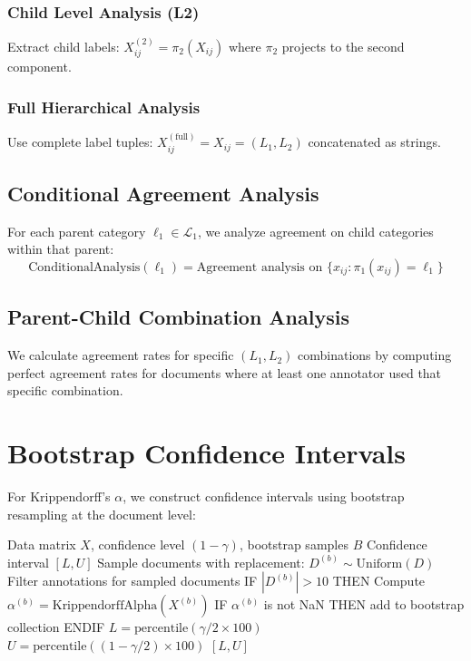 \documentclass[11pt]{article}
\begin{document}
\subsubsection{Child Level Analysis (L2)}
Extract child labels: $X^{(2)}_{ij} = \pi_2(X_{ij})$ where $\pi_2$ projects to the second component.

\subsubsection{Full Hierarchical Analysis}
Use complete label tuples: $X^{(\text{full})}_{ij} = X_{ij} = (L_1, L_2)$ concatenated as strings.

\subsection{Conditional Agreement Analysis}

For each parent category $\ell_1 \in \mathcal{L}_1$, we analyze agreement on child categories within that parent:
\begin{equation}
\text{ConditionalAnalysis}(\ell_1) = \text{Agreement analysis on } \{x_{ij} : \pi_1(x_{ij}) = \ell_1\}
\end{equation}

\subsection{Parent-Child Combination Analysis}

We calculate agreement rates for specific $(L_1, L_2)$ combinations by computing perfect agreement rates for documents where at least one annotator used that specific combination.

\section{Bootstrap Confidence Intervals}

For Krippendorff's $\alpha$, we construct confidence intervals using bootstrap resampling at the document level:

\begin{algorithm}
\caption{Bootstrap Confidence Interval (as implemented)}
\begin{algorithmic}[1]
\REQUIRE Data matrix $X$, confidence level $(1-\gamma)$, bootstrap samples $B$
\ENSURE Confidence interval $[L, U]$
    \STATE Sample documents with replacement: $D^{(b)} \sim \text{Uniform}(D)$
    \STATE Filter annotations for sampled documents
    \STATE IF $|D^{(b)}| > 10$ THEN
        \STATE Compute $\alpha^{(b)} = \text{KrippendorffAlpha}(X^{(b)})$
        \STATE IF $\alpha^{(b)}$ is not NaN THEN add to bootstrap collection
    \STATE ENDIF
\ENDFOR
\STATE $L = \text{percentile}(\gamma/2 \times 100)$
\STATE $U = \text{percentile}((1-\gamma/2) \times 100)$
\STATE \RETURN $[L, U]$
\end{algorithmic}
\end{algorithm}
\end{document}
